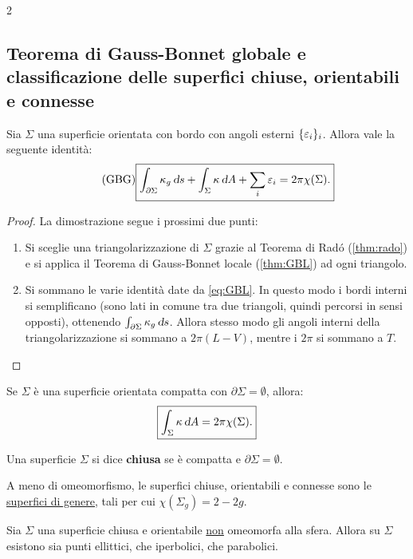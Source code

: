 \begin{multicols*}{2}
    \subsection{Teorema di Gauss-Bonnet globale e classificazione delle superfici chiuse, orientabili e connesse}

    \begin{theorem} \label{thm:GBG}
        Sia $\Sigma$ una superficie orientata con bordo con angoli esterni $\{\varepsilon_i\}_i$. Allora vale
        la seguente identità:
        \begin{equation} \label{eq:GBG} \tag{GBG}
            \boxed{\int_{\partial \Sigma} \kappa_g \ds + \int_\Sigma \kappa \dA + \sum_i \eps_i = 2\pi \chi(\Sigma).}
        \end{equation}
    \end{theorem}

    \begin{proof}
        La dimostrazione segue i prossimi due punti:
        \begin{enumerate}
            \item Si sceglie una triangolarizzazione di $\Sigma$ grazie al Teorema di Radó (\ref{thm:rado}) e si applica il Teorema di Gauss-Bonnet locale
                  (\ref{thm:GBL}) ad ogni triangolo.
            \item Si sommano le varie identità date da \eqref{eq:GBL}. In questo modo i bordi interni si semplificano
                  (sono lati in comune tra due triangoli, quindi percorsi in sensi opposti), ottenendo
                  $\int_{\partial \Sigma} \kappa_g \ds$. Allora stesso modo gli angoli interni della triangolarizzazione si sommano
                  a $2\pi (L - V)$, mentre i $2\pi$ si sommano a $T$.
        \end{enumerate}
    \end{proof}

    \begin{corollary}
        Se $\Sigma$ è una superficie orientata compatta con $\partial \Sigma = \emptyset$, allora:
        \[
            \boxed{\int_\Sigma \kappa \dA = 2\pi \chi(\Sigma).}
        \]
    \end{corollary}

    \begin{definition}
        Una superficie $\Sigma$ si dice \textbf{chiusa} se è
        compatta e $\partial \Sigma = \emptyset$.
    \end{definition}

    \begin{theorem}
        A meno di omeomorfismo, le superfici chiuse, orientabili e connesse
        sono le \underline{superfici di genere}, tali per cui $\chi(\Sigma_g) = 2-2g$.
    \end{theorem}

    \begin{corollary}
        Sia $\Sigma$ una superficie chiusa e orientabile \underline{non}
        omeomorfa alla sfera. Allora su $\Sigma$ esistono sia punti ellittici,
        che iperbolici, che parabolici.
    \end{corollary}
\end{multicols*}
